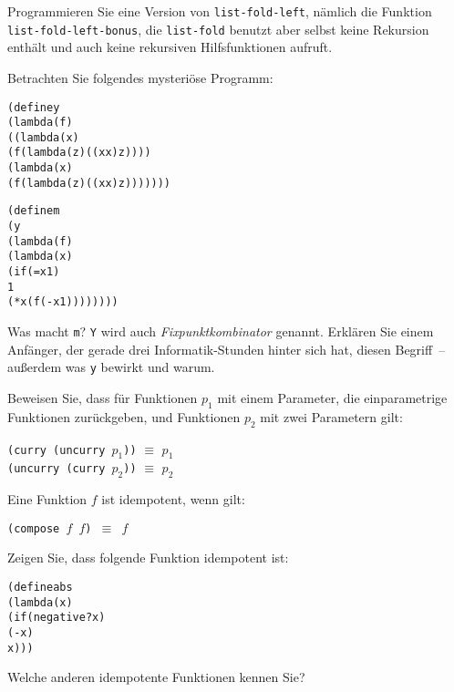 \begin{aufgabe}
  Programmieren Sie eine Version von
  \texttt{list-fold-left}, nämlich die Funktion
  \texttt{list-fold-left-bonus}, die \texttt{list-fold} benutzt aber
  selbst keine Rekursion enthält und auch keine rekursiven
  Hilfsfunktionen aufruft.
\end{aufgabe}


\begin{aufgabe}
  Betrachten Sie folgendes mysteriöse Programm:
  \begin{alltt}
(define y
  (lambda (f)
    ((lambda (x)
       (f (lambda (z) ((x x) z))))
     (lambda (x)
       (f (lambda (z) ((x x) z)))))))

(define m
  (y
   (lambda (f)
     (lambda (x)
       (if (= x 1)
           1
           (* x (f (- x 1))))))))
   \end{alltt}
   Was macht \texttt{m}?  \texttt{Y} wird auch
   \textit{Fixpunktkombinator} genannt.  Erklären Sie einem Anfänger, der
   gerade drei Informatik-Stunden hinter sich hat, diesen Begriff~--
   außerdem was
   \texttt{y} bewirkt und warum.
 \end{aufgabe}

\begin{aufgabe}
  Beweisen Sie, dass für Funktionen $p_1$ mit einem Parameter, die
  einparametrige Funktionen zurückgeben, und Funktionen $p_2$ mit zwei
  Parametern gilt:
  \begin{center}
    \texttt{(curry (uncurry $p_1$))} $\equiv$ $p_1$\\
    \texttt{(uncurry (curry $p_2$))} $\equiv$ $p_2$
  \end{center}
 \end{aufgabe}

\begin{aufgabe}
  Eine Funktion $f$ ist idempotent, wenn gilt:

  \begin{center}
    \texttt{(compose $f$ $f$) $\equiv$ $f$}
  \end{center}

  Zeigen Sie, dass folgende Funktion idempotent ist:

  \begin{alltt}
    (define abs
      (lambda (x)
         (if (negative? x)
             (- x)
             x)))  \end{alltt}

  Welche anderen idempotente Funktionen kennen Sie?
\end{aufgabe}

